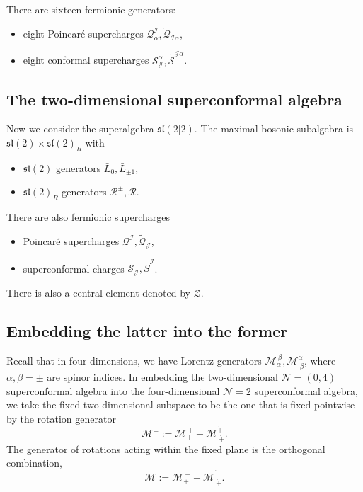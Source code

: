 \documentclass[a4paper,11pt]{article}
\begin{document}
\bigskip
There are sixteen fermionic generators:
\begin{itemize}
    \item eight Poincar\'{e} supercharges $\mathcal{Q}^\mathcal{I}_\alpha, \widetilde{\mathcal{Q}}_{\mathcal{I} \dot{\alpha}}$,
    \item eight conformal supercharges $\mathcal{S}^\alpha_\mathcal{J}, \widetilde{\mathcal{S}}^{\mathcal{J} \dot{\alpha}}$.
\end{itemize}

\subsection{The two-dimensional superconformal algebra}
Now we consider the superalgebra $\mathfrak{sl}(2|2)$. The maximal bosonic subalgebra is $\mathfrak{sl}(2) \times \mathfrak{sl}(2)_R$ with
\begin{itemize}
    \item $\mathfrak{sl}(2)$ generators $\bar{L}_0, \bar{L}_{\pm 1}$,
    \item $\mathfrak{sl}(2)_R$ generators $\mathcal{R}^\pm, \mathcal{R}$.
\end{itemize}
There are also fermionic supercharges
\begin{itemize}
    \item Poincar\'{e} supercharges $\mathcal{Q}^\mathcal{I}, \widetilde{\mathcal{Q}}_\mathcal{J}$,
    \item superconformal charges $\mathcal{S}_\mathcal{J}, \widetilde{S}^\mathcal{I}$.
\end{itemize}
There is also a central element denoted by $\mathcal{Z}$.


\subsection{Embedding the latter into the former}
Recall that in four dimensions, we have Lorentz generators $\mathcal{M}_\alpha^{~\beta}, \mathcal{M}^{\dot{\alpha}}_{~\dot{\beta}}$, where $\alpha, \beta = \pm$ are spinor indices. In embedding the two-dimensional $\mathcal{N}= (0,4)$ superconformal algebra into the four-dimensional $\mathcal{N}=2$ superconformal algebra, we take the fixed two-dimensional subspace to be the one that is fixed pointwise by the rotation generator
\begin{equation}
    \mathcal{M}^\perp := \mathcal{M}_+^{~+} - \mathcal{M}^{\dot{+}}_{~\dot{+}}.
\end{equation}
The generator of rotations acting within the fixed plane is the orthogonal combination,
\begin{equation}
    \mathcal{M} := \mathcal{M}_+^{~+} + \mathcal{M}^{\dot{+}}_{~\dot{+}}.
\end{equation}
\end{document}
